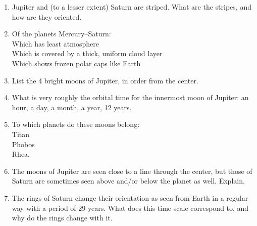 \begin{enumerate}
\item
Jupiter and (to a lesser extent) Saturn are striped. What are the
stripes, and how are they oriented.

\item
Of the planets Mercury--Saturn:\\
Which has least atmosphere \\
Which is covered by a thick, uniform cloud layer \\
Which shows frozen polar caps like Earth \\

\item
List the 4 bright moons of Jupiter, in order from the center.

\item
What is very roughly the orbital time for the innermost moon of Jupiter: an
hour, a day, a month, a year, 12 years.

\item
To which planets do these moons belong: \\
Titan \\
Phobos \\
Rhea.

\item
The moons of Jupiter are seen close to a line through the center, but
those of Saturn are sometimes seen above and/or  below the planet as
well. Explain.  


\item 
The rings of Saturn change their orientation as seen from Earth in a
regular way with a period of 29 years. What does this time scale
correspond to, and why do the rings change with it.




\end{enumerate} 













